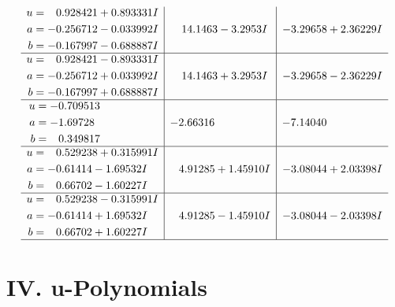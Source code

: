 \documentclass[1p]{elsarticle_modified}
\theoremstyle{definition}
\begin{document}
$$\begin{array}{c|c|c}
\begin{aligned}
u &= \phantom{-}0.928421 + 0.893331 I \\
a &= -0.256712 - 0.033992 I \\
b &= -0.167997 - 0.688887 I\end{aligned}
 & \phantom{-}14.1463 - 3.2953 I & -3.29658 + 2.36229 I \\ \hline\begin{aligned}
u &= \phantom{-}0.928421 - 0.893331 I \\
a &= -0.256712 + 0.033992 I \\
b &= -0.167997 + 0.688887 I\end{aligned}
 & \phantom{-}14.1463 + 3.2953 I & -3.29658 - 2.36229 I \\ \hline\begin{aligned}
u &= -0.709513\phantom{ +0.000000I} \\
a &= -1.69728\phantom{ +0.000000I} \\
b &= \phantom{-}0.349817\phantom{ +0.000000I}\end{aligned}
 & -2.66316\phantom{ +0.000000I} & -7.14040\phantom{ +0.000000I} \\ \hline\begin{aligned}
u &= \phantom{-}0.529238 + 0.315991 I \\
a &= -0.61414 - 1.69532 I \\
b &= \phantom{-}0.66702 - 1.60227 I\end{aligned}
 & \phantom{-}4.91285 + 1.45910 I & -3.08044 + 2.03398 I \\ \hline\begin{aligned}
u &= \phantom{-}0.529238 - 0.315991 I \\
a &= -0.61414 + 1.69532 I \\
b &= \phantom{-}0.66702 + 1.60227 I\end{aligned}
 & \phantom{-}4.91285 - 1.45910 I & -3.08044 - 2.03398 I\\
 \hline 
 \end{array}$$\newpage
\newpage\renewcommand{\arraystretch}{1}
\centering \section*{ IV. u-Polynomials}
\end{document}
